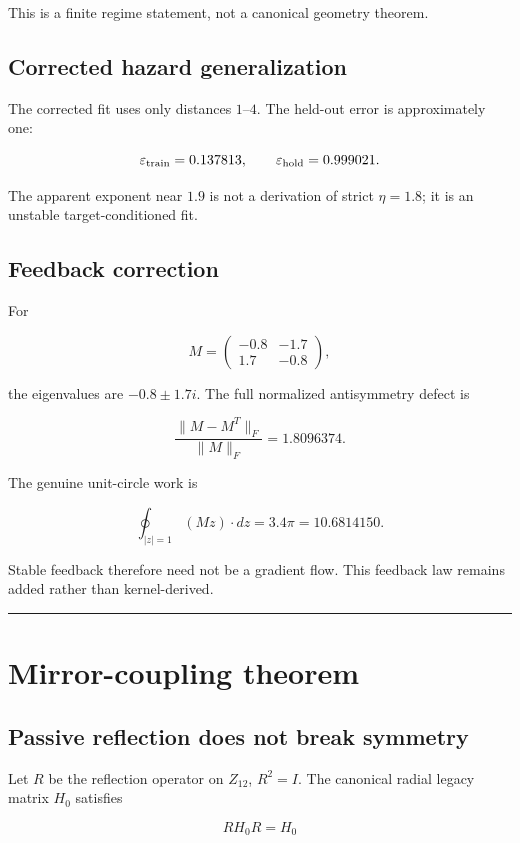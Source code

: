 \documentclass[11pt,a4paper,openany]{report}
\begin{document}
This is a finite regime statement, not a canonical geometry theorem.

\section{Corrected hazard generalization}

The corrected fit uses only distances \(1\)–\(4\). The held-out error is approximately one:

\[
\varepsilon_{\rm train}=0.137813,
\qquad
\varepsilon_{\rm hold}=0.999021.
\]

The apparent exponent near \(1.9\) is not a derivation of strict \(\eta=1.8\); it is an unstable target-conditioned fit.

\section{Feedback correction}

For

\[
M=
\begin{pmatrix}
-0.8&-1.7\\
1.7&-0.8
\end{pmatrix},
\]

the eigenvalues are \(-0.8\pm1.7i\). The full normalized antisymmetry defect is

\[
\frac{\|M-M^T\|_F}{\|M\|_F}=1.8096374.
\]

The genuine unit-circle work is

\[
\oint_{|z|=1}(Mz)\cdot dz
=
3.4\pi
=
10.6814150.
\]

Stable feedback therefore need not be a gradient flow. This feedback law remains added rather than kernel-derived.

\par\medskip\hrule\medskip

\chapter{Mirror-coupling theorem}

\section{Passive reflection does not break symmetry}

Let \(R\) be the reflection operator on \(Z_{12}\), \(R^2=I\). The canonical radial legacy matrix \(H_0\) satisfies

\[
RH_0R=H_0
\]
\end{document}
